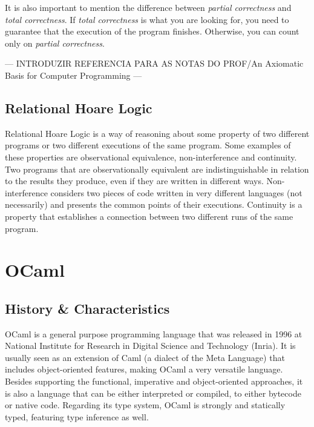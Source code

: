 It is also important to mention the difference between \emph{partial correctness} and \emph{total correctness}.
If \emph{total correctness} is what you are looking for, you need to guarantee that the execution of the program finishes.
Otherwise, you can count only on \emph{partial correctness}.

--- INTRODUZIR REFERENCIA PARA AS NOTAS DO PROF/An Axiomatic Basis for Computer Programming ---


\subsection{Relational Hoare Logic} 
\label{sub:relational_hoare_logic}

Relational Hoare Logic is a way of reasoning about some property of two different programs or two different executions of the same program.
Some examples of these properties are observational equivalence, non-interference and continuity.
Two programs that are observationally equivalent are indistinguishable in relation to the results they produce, even if they are written in different ways.
Non-interference considers two pieces of code written in very different languages (not necessarily) and presents the common points of their executions.
Continuity is a property that establishes a connection between two different runs of the same program.



\section{OCaml}
\label{sec:ocaml}

\subsection{History \& Characteristics} 
\label{sub:overview}

OCaml is a general purpose programming language that was released in 1996 at National Institute for Research in Digital Science and Technology (Inria).
It is usually seen as an extension of Caml (a dialect of the Meta Language) that includes object-oriented features, making OCaml a very versatile language.
Besides supporting the functional, imperative and object-oriented approaches, it is also a language that can be either interpreted or compiled, to either bytecode or native code. 
Regarding its type system, OCaml is strongly and statically typed, featuring type inference as well.


